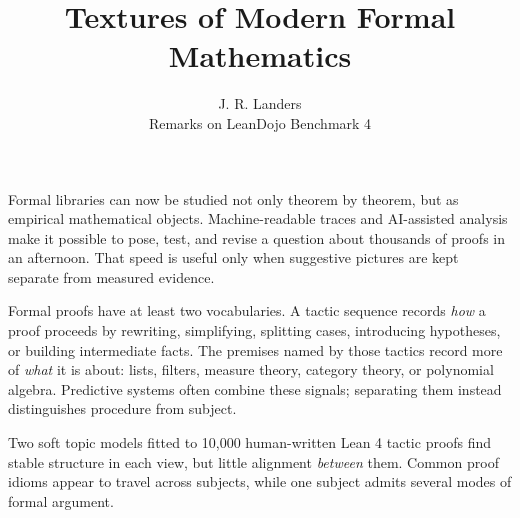 \documentclass[11pt]{article}
\title{\vspace{-1.6em}\textbf{Textures of Modern Formal Mathematics}\vspace{-0.5em}}
\author{J. R. Landers\\[-1pt]\small Remarks on LeanDojo Benchmark 4}
\date{\vspace{-1.2em}}
\begin{document}
\maketitle
\vspace{-1.6em}

Formal libraries can now be studied not only theorem by theorem, but as empirical mathematical
objects.  Machine-readable traces and AI-assisted analysis make it possible to pose, test, and
revise a question about thousands of proofs in an afternoon.  That speed is useful only when
suggestive pictures are kept separate from measured evidence.

Formal proofs have at least two vocabularies.  A tactic sequence records \emph{how} a proof
proceeds by rewriting, simplifying, splitting cases, introducing hypotheses, or building
intermediate facts.
The premises named by those tactics record more of \emph{what} it is about: lists, filters,
measure theory, category theory, or polynomial algebra.  Predictive systems often combine
these signals; separating them instead distinguishes procedure from subject.

Two soft topic models fitted to 10,000 human-written Lean 4 tactic proofs find stable structure
in each view, but little alignment \emph{between} them.  Common proof idioms appear to travel
across subjects, while one subject admits several modes of formal argument.
\end{document}
